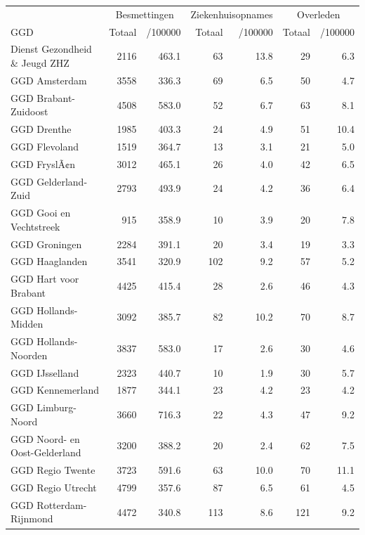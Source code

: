 \documentclass[
  english,
  man,floatsintext]{apa6}
\begin{document}
\begin{table}[H]
\centering\begingroup\fontsize{10}{12}\selectfont

\begin{threeparttable}
\begin{tabular}{lrrrrrr}
\toprule
\multicolumn{1}{c}{ } & \multicolumn{2}{c}{Besmettingen} & \multicolumn{2}{c}{Ziekenhuisopnames} & \multicolumn{2}{c}{Overleden} \\
\cmidrule(l{3pt}r{3pt}){2-3} \cmidrule(l{3pt}r{3pt}){4-5} \cmidrule(l{3pt}r{3pt}){6-7}
GGD & Totaal & /100000 & Totaal & /100000 & Totaal & /100000\\
\midrule
Dienst Gezondheid \& Jeugd ZHZ & 2116 & 463.1 & 63 & 13.8 & 29 & 6.3\\
GGD Amsterdam & 3558 & 336.3 & 69 & 6.5 & 50 & 4.7\\
GGD Brabant-Zuidoost & 4508 & 583.0 & 52 & 6.7 & 63 & 8.1\\
GGD Drenthe & 1985 & 403.3 & 24 & 4.9 & 51 & 10.4\\
GGD Flevoland & 1519 & 364.7 & 13 & 3.1 & 21 & 5.0\\
GGD FryslÃ¢n & 3012 & 465.1 & 26 & 4.0 & 42 & 6.5\\
GGD Gelderland-Zuid & 2793 & 493.9 & 24 & 4.2 & 36 & 6.4\\
GGD Gooi en Vechtstreek & 915 & 358.9 & 10 & 3.9 & 20 & 7.8\\
GGD Groningen & 2284 & 391.1 & 20 & 3.4 & 19 & 3.3\\
GGD Haaglanden & 3541 & 320.9 & 102 & 9.2 & 57 & 5.2\\
GGD Hart voor Brabant & 4425 & 415.4 & 28 & 2.6 & 46 & 4.3\\
GGD Hollands-Midden & 3092 & 385.7 & 82 & 10.2 & 70 & 8.7\\
GGD Hollands-Noorden & 3837 & 583.0 & 17 & 2.6 & 30 & 4.6\\
GGD IJsselland & 2323 & 440.7 & 10 & 1.9 & 30 & 5.7\\
GGD Kennemerland & 1877 & 344.1 & 23 & 4.2 & 23 & 4.2\\
GGD Limburg-Noord & 3660 & 716.3 & 22 & 4.3 & 47 & 9.2\\
GGD Noord- en Oost-Gelderland & 3200 & 388.2 & 20 & 2.4 & 62 & 7.5\\
GGD Regio Twente & 3723 & 591.6 & 63 & 10.0 & 70 & 11.1\\
GGD Regio Utrecht & 4799 & 357.6 & 87 & 6.5 & 61 & 4.5\\
GGD Rotterdam-Rijnmond & 4472 & 340.8 & 113 & 8.6 & 121 & 9.2\\

\end{tabular}
\end{threeparttable}
\end{table}
\end{document}
